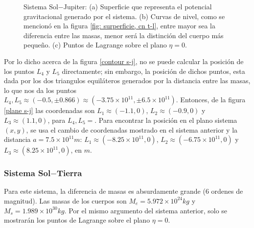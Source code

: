 \begin{figure}[H]
\caption{Sistema Sol$-$Jupiter: (a) Superficie que representa el potencial gravitacional generado por el sistema. (b) Curvas de nivel, como se mencionó en la figura \ref{fig: surperficie, cn t-l}, entre mayor sea la diferencia entre las masas, menor será la distinción del cuerpo más pequeño. (c) Puntos de Lagrange sobre el plano $\eta = 0$.}
\label{superficie, cn, plane s-j}
\end{figure}

Por lo dicho acerca de la figura \ref{contour s-j}, no se puede calcular la posición de los puntos $L_4$ y $L_5$ directamente; sin embargo, la posición de dichos puntos, esta dada por los dos triangulos equiláteros generados por la distancia entre las masas, lo que nos da los puntos $L_4, L_5 \approx (-0.5,\pm 0.866) \approx (-3.75\times 10^{11},\pm 6.5\times 10^{11})$. Entonces, de la figura \ref{plane s-j} las coordenadas son $L_1 \approx (-1.1,0)$, $L_2 \approx (-0.9,0)$ y $L_3 \approx (1.1,0)$, para $L_4 , L_5 = $. Para encontrar la posición en el plano sistema $(x,y)$, se usa el cambio de coordenadas mostrado en el sistema anterior y la distancia $a = 7.5\times 10^{11}m$: $L_1 \approx (-8.25\times 10 ^{11},0)$, $L_2 \approx (-6.75\times 10 ^{11},0)$ y $L_3 \approx (8.25\times 10 ^{11},0)$, en $m$.



\subsubsection{Sistema Sol$-$Tierra}

Para este sistema, la diferencia de masas es absurdamente grande ($6$ ordenes de magnitud). Las masas de los cuerpos son $M_e = 5.972\times 10^{24} kg$ y $M_s = 1.989\times 10 ^{30} kg$. Por el mismo argumento del sistema anterior, solo se mostrarán los puntos de Lagrange sobre el plano $\eta = 0$.

